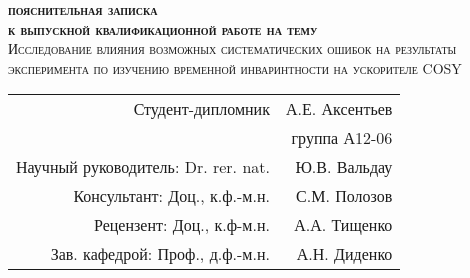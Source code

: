 
\begin{titlepage}
	\begin{center}
		
		
		\textsc{\textbf{пояснительная записка \\
				к выпускной квалификационной работе на тему}}\\[2cm]
		
		\textsc{Исследование влияния возможных систематических ошибок на результаты эксперимента по изучению временной инваринтности на ускорителе COSY \\[2.4cm] }
		
		
	\end{center}
	
	
	\begin{flushright}
		\begin{tabular}{rr}
			Студент-дипломник \underline{\hspace*{3cm}} & А.Е. Аксентьев \\
			&	группа А12-06 \\					
			Научный руководитель: Dr. rer. nat. \underline{\hspace*{3cm}} & Ю.В. Вальдау \\
			Консультант:          Доц., к.ф.-м.н. \underline{\hspace*{3cm}} & С.М. Полозов 	\\
			Рецензент:			  Доц., к.ф-м.н. \underline{\hspace*{3cm}} & А.А. Тищенко \\
			Зав. кафедрой:		  Проф., д.ф.-м.н. \underline{\hspace*{3cm}} & А.Н. Диденко
		\end{tabular}
		
	\end{flushright}
	
	\vfill
	
	
	\begin{center}
		\the\year{}
	\end{center}
	
	
	
\end{titlepage}